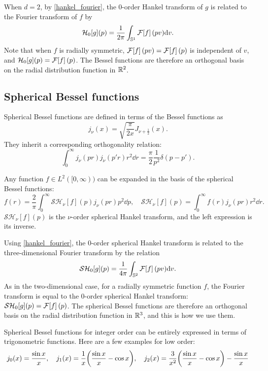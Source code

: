 \documentclass[../../main.tex]{subfiles}
\begin{document}
\begin{refsection}
	When $d=2$, by \cref{hankel_fourier}, the 0-order Hankel transform of $g$ is related to the Fourier transform of $f$ by
	$$\mathcal{H}_0[g](p) = \frac{1}{2\pi} \int_{\mathbb{S}^{1}} \mathcal{F}\qty[f](p v) \dd v.$$
	Note that when $f$ is radially symmetric, $\mathcal{F}\qty[f](p v) = \mathcal{F}\qty[f](p)$ is independent of $v$, and $\mathcal{H}_0[g](p) = \mathcal{F}\qty[f](p)$.
	The Bessel functions are therefore an orthogonal basis on the radial distribution function in $\mathbb{R}^2$.

	\subsection{Spherical Bessel functions}

	Spherical Bessel functions are defined in terms of the Bessel functions as
	$$j_\nu(x) = \sqrt{\frac{\pi}{2 x}} J_{\nu + \frac{1}{2}}(x).$$
	They inherit a corresponding orthogonality relation:
	$$\int_{0}^\infty j_\nu(p r) j_\nu(p' r) r^2 \dd r = \frac{\pi}{2} \frac{1}{p^2} \delta(p - p').$$

	Any function $f \in L^2([0, \infty))$ can be expanded in the basis of the spherical Bessel functions:
	\begin{equation}\label{spherical_hankel}
		f(r) = \frac{2}{\pi}\int_0^\infty \mathcal{SH}_\nu[f](p) j_\nu(p r) p^2 \dd p, \quad \mathcal{SH}_\nu[f](p) = \int_0^\infty f(r) j_\nu(p r) r^2 \dd r.
	\end{equation}
	$\mathcal{SH}_\nu[f](p)$ is the $\nu$-order spherical Hankel transform, and the left expression is its inverse.

	Using \cref{hankel_fourier}, the 0-order spherical Hankel transform is related to the three-dimensional Fourier transform by the relation
	$$\mathcal{SH}_0[g](p) = \frac{1}{4\pi} \int_{\mathbb{S}^{2}} \mathcal{F}\qty[f](p v) \dd v.$$
	As in the two-dimensional case, for a radially symmetric function $f$, the Fourier transform is equal to the 0-order spherical Hankel transform: $\mathcal{SH}_0[g](p) = \mathcal{F}\qty[f](p)$.
	The spherical Bessel functions are therefore an orthogonal basis on the radial distribution function in $\mathbb{R}^3$, and this is how we use them.

	Spherical Bessel functions for integer order can be entirely expressed in terms of trigonometric functions.
	Here are a few examples for low order:
	\begin{equation*}
		j_0(x) = \frac{\sin x}{x}, \quad
		j_1(x) = \frac{1}{x} \qty(\frac{\sin x}{x} - \cos x), \quad
		j_2(x) = \frac{3}{x^2} \qty(\frac{\sin x}{x} - \cos x) - \frac{\sin x}{x}
	\end{equation*}


\end{refsection}
\end{document}
